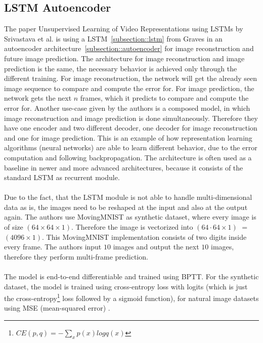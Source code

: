  \subsection{LSTM Autoencoder} \label{subsection::lstm_autoencoder}
  The paper \glqq Unsupervised Learning of Video Representations using LSTMs\grqq{} by Srivastava et al. \cite{Srivastava2015} is using a LSTM~\ref{subsection::lstm} from Graves 
  \cite{Graves2013} in an autoencoder architecture~\ref{subsection::autoencoder} for image reconstruction and future image prediction.
  The architecture for image reconstruction and image prediction is the same, the necessary behavior is achieved only through the different training.
  For image reconstruction, the network will get the already seen image sequence to compare and compute the error for. For image prediction, the network gets
  the next $n$ frames, which it predicts to compare and compute the error for.
  Another use-case given by the authors is a composed model, in which image reconstruction and image prediction is done simultaneously. Therefore they have
  one encoder and two different decoder, one decoder for image reconstruction and one for image prediction.
  This is an example of how representation learning algorithms (neural networks) are able to learn different behavior, due to the error computation and following
  backpropagation.
  The architecture is often used as a baseline in newer and more advanced architectures, because it consists of the standard LSTM as recurrent module.
  \\\\
  Due to the fact, that the LSTM module is not able to handle multi-dimensional data as is, the images need to be reshaped at the input and also at the output again. The authors use
  MovingMNIST \cite{LeCun1998} as synthetic dataset, where every image is of size $(64 \times 64 \times 1)$. Therefore the image is vectorized into $(64 \cdot 64 \times 1)$ $=$ $(4096 \times 1)$.
  This MovingMNIST implementation consists of two digits inside every frame. The authors input $10$ images and output the next $10$ images, therefore they perform 
  multi-frame prediction.
  \\\\
  The model is end-to-end differentiable and trained using BPTT.
  For the synthetic dataset, the model is trained using cross-entropy loss with logits (which is just the cross-entropy\footnote{$CE(p,q) = -\sum_xp(x)logq(x)$} 
  loss followed by a sigmoid function), for natural image datasets using MSE (mean-squared error) \cite{Zhao2017}.
